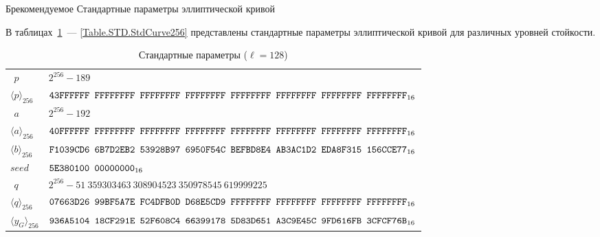 \begin{appendix}{Б}{рекомендуемое}
{Стандартные параметры эллиптической кривой}
\label{STD}

\mbox{}

В таблицах~\ref{Table.STD.StdCurve128}~--- \ref{Table.STD.StdCurve256} 
представлены стандартные параметры 
эллиптической кривой для различных уровней стойкости.

\begin{table}[!h]
\caption{Стандартные параметры ($\ell=128$)}\label{Table.STD.StdCurve128}
{\small
\begin{tabular}{|l|l|}
\hline
$\phantom{\langle}p\phantom{\rangle}$ &
$2^{256}-189$\\
$\langle p\rangle_{256}$ & 
$\texttt{43FFFFFF~FFFFFFFF~FFFFFFFF~FFFFFFFF~FFFFFFFF~FFFFFFFF~FFFFFFFF~FFFFFFFF}_{16}$\\
%
\hline
$\phantom{\langle}a\phantom{\rangle}$ &
$2^{256}-192$\\
$\langle a\rangle_{256}$ & 
$\texttt{40FFFFFF~FFFFFFFF~FFFFFFFF~FFFFFFFF~FFFFFFFF~FFFFFFFF~FFFFFFFF~FFFFFFFF}_{16}$\\
%
\hline
$\langle b\rangle_{256}$ & 
$\texttt{F1039CD6~6B7D2EB2~53928B97~6950F54C~BEFBD8E4~AB3AC1D2~EDA8F315~156CCE77}_{16}$\\
%
\hline
$seed$ & 
$\texttt{5E380100~00000000}_{16}$\\
%
\hline
$\phantom{\langle}q\phantom{\rangle}$ &
$2^{256}-51~359303463~308904523~350978545~619999225$\\
$\langle q\rangle_{256}$ & 
$\texttt{07663D26~99BF5A7E~FC4DFB0D~D68E5CD9~FFFFFFFF~FFFFFFFF~FFFFFFFF~FFFFFFFF}_{16}$\\
%
\hline
$\langle y_G\rangle_{256}$ & 
$\texttt{936A5104~18CF291E~52F608C4~66399178~5D83D651~A3C9E45C~9FD616FB~3CFCF76B}_{16}$\\
\hline
\end{tabular}
}
\end{table}

%
%
%


\end{appendix}
